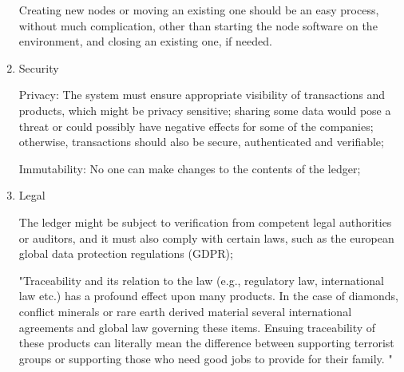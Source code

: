\begin{enumerate}
		\par Creating new nodes or moving an existing one should be an easy process, without much complication, other than starting the node software on the environment, and closing an existing one, if needed.
    \item  Security
		\par Privacy: The system must ensure appropriate visibility of transactions and products, which might be privacy sensitive; sharing some data would pose a threat or could possibly have negative effects for some of the companies; otherwise, transactions should also be secure, authenticated and verifiable;
		\par Immutability: No one can make changes to the contents of the ledger;
	\item  Legal
		\par The ledger might be subject to verification from competent legal authorities or auditors, and it must also comply with certain laws, such as the european global data protection regulations (GDPR);
		\par "Traceability and its relation to the law (e.g., regulatory law, international law etc.) has a profound effect upon many products. In the case of diamonds, conflict minerals or rare earth derived material several international agreements and global law governing these items. Ensuing traceability of these products can literally mean the difference between supporting terrorist groups or supporting those who need good jobs to provide for their family. "
		
\end{enumerate}



